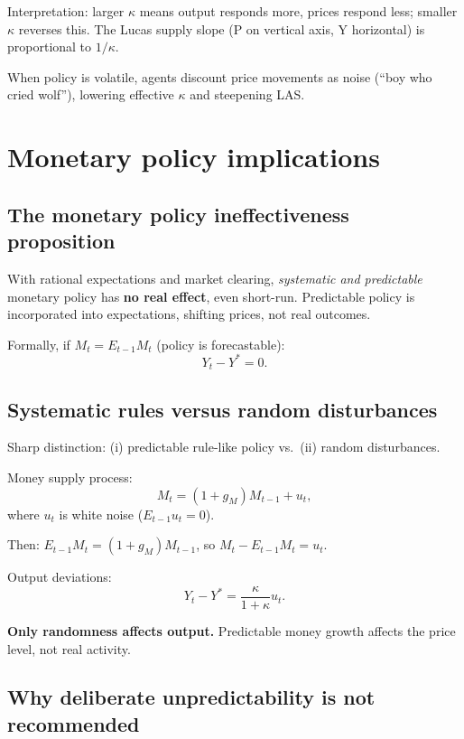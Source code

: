 \documentclass[
  letterpaper,
  DIV=11,
  numbers=noendperiod]{scrartcl}
\begin{document}
Interpretation: larger \(\kappa\) means output responds more, prices
respond less; smaller \(\kappa\) reverses this. The Lucas supply slope
(P on vertical axis, Y horizontal) is proportional to \(1/\kappa\).

When policy is volatile, agents discount price movements as noise (``boy
who cried wolf''), lowering effective \(\kappa\) and steepening LAS.

\section{Monetary policy
implications}\label{monetary-policy-implications-1}

\subsection{The monetary policy ineffectiveness
proposition}\label{the-monetary-policy-ineffectiveness-proposition-1}

With rational expectations and market clearing, \emph{systematic and
predictable} monetary policy has \textbf{no real effect}, even
short-run. Predictable policy is incorporated into expectations,
shifting prices, not real outcomes.

Formally, if \(M_t = E_{t-1}M_t\) (policy is forecastable):
\[Y_t - Y^* = 0.\]

\subsection{Systematic rules versus random
disturbances}\label{systematic-rules-versus-random-disturbances-1}

Sharp distinction: (i) predictable rule-like policy vs.~(ii) random
disturbances.

Money supply process: \[M_t = (1 + g_M)M_{t-1} + u_t,\] where \(u_t\) is
white noise (\(E_{t-1}u_t = 0\)).

Then: \(E_{t-1}M_t = (1 + g_M)M_{t-1}\), so \(M_t - E_{t-1}M_t = u_t\).

Output deviations: \[Y_t - Y^* = \frac{\kappa}{1+\kappa}u_t.\]

\textbf{Only randomness affects output.} Predictable money growth
affects the price level, not real activity.

\subsection{Why deliberate unpredictability is not
recommended}\label{why-deliberate-unpredictability-is-not-recommended-1}
\end{document}
